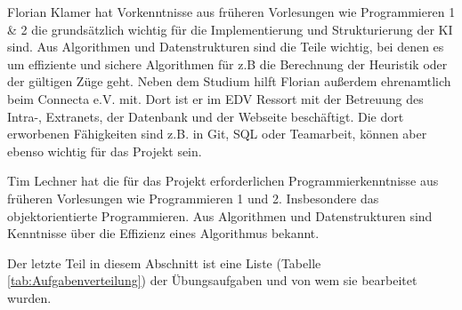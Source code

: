 \documentclass[12pt,a4paper,bibliography=totocnumbered,listof=totocnumbered]{scrartcl}
\begin{document}
    Florian Klamer hat Vorkenntnisse aus früheren Vorlesungen wie Programmieren 1 \& 2 die grundsätzlich wichtig für die Implementierung und Strukturierung der KI sind. Aus Algorithmen und Datenstrukturen sind die Teile wichtig, bei denen es um effiziente und sichere Algorithmen für z.B die Berechnung der Heuristik oder der gültigen Züge geht. Neben dem Studium hilft Florian außerdem ehrenamtlich beim Connecta e.V. mit. Dort ist er im EDV Ressort mit der Betreuung des Intra-, Extranets, der Datenbank und der Webseite beschäftigt. Die dort erworbenen Fähigkeiten sind z.B. in Git, SQL oder Teamarbeit, können aber ebenso wichtig für das Projekt sein.

	Tim Lechner hat die für das Projekt erforderlichen Programmierkenntnisse aus früheren Vorlesungen wie Programmieren 1 und 2. Insbesondere das objektorientierte Programmieren. Aus Algorithmen und Datenstrukturen sind Kenntnisse über die Effizienz eines Algorithmus bekannt.  
    

    Der letzte Teil in diesem Abschnitt ist eine Liste (Tabelle \ref{tab:Aufgabenverteilung}) der Übungsaufgaben und von wem sie bearbeitet wurden.\newline
\end{document}
